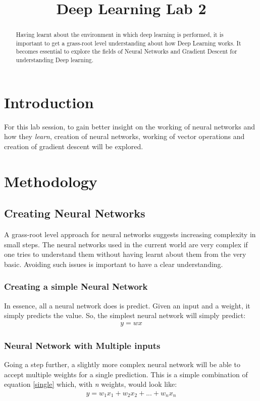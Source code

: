 \documentclass[conference,compsoc]{IEEEtran}
\begin{document}
\title{Deep Learning Lab 2}
\author{}

\maketitle
\begin{abstract}
    Having learnt about the environment in which deep learning is performed, it is important to get a grass-root level understanding about how Deep Learning works. It becomes essential to explore the fields of Neural Networks and Gradient Descent for understanding Deep learning.
\end{abstract}

\section{Introduction}
For this lab session, to gain better insight on the working of neural networks and how they \emph{learn}, creation of neural networks, working of vector operations and creation of gradient descent will be explored.

\section{Methodology}
\subsection{Creating Neural Networks}
A grass-root level approach for neural networks suggests increasing complexity in small steps. The neural networks used in the current world are very complex if one tries to understand them without having learnt about them from the very basic. Avoiding such issues is important to have a clear understanding.

\subsubsection{Creating a simple Neural Network}
In essence, all a neural network does is predict. Given an input and a weight, it simply predicts the value. So, the simplest neural network will simply predict:
\begin{gather*}\label{single}
    y=wx
\end{gather*}

\subsubsection{Neural Network with Multiple inputs}
Going a step further, a slightly more complex neural network will be able to accept multiple weights for a single prediction. This is a simple combination of equation \ref{single} which, with \emph{n} weights, would look like:
\begin{gather*}\label{multiin}
    y=w_1x_1+w_2x_2+...+w_nx_n
\end{gather*}
\end{document}
